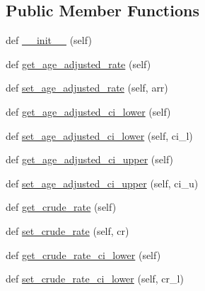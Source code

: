 \subsection*{Public Member Functions}
\begin{DoxyCompactItemize}
\item 
def \hyperlink{classbridges_1_1data__src__dependent_1_1cancer__incidence_1_1_cancer_incidence_a14ca87e4a6a0c2f394c46f0980ac922c}{\+\_\+\+\_\+init\+\_\+\+\_\+} (self)
\item 
def \hyperlink{classbridges_1_1data__src__dependent_1_1cancer__incidence_1_1_cancer_incidence_a8f679189f9811d6f5c43503f95d87666}{get\+\_\+age\+\_\+adjusted\+\_\+rate} (self)
\item 
def \hyperlink{classbridges_1_1data__src__dependent_1_1cancer__incidence_1_1_cancer_incidence_a437897ce848c5deec32b7c8eafc1ff68}{set\+\_\+age\+\_\+adjusted\+\_\+rate} (self, arr)
\item 
def \hyperlink{classbridges_1_1data__src__dependent_1_1cancer__incidence_1_1_cancer_incidence_ae567ee5ec0334912272652eaed74f838}{get\+\_\+age\+\_\+adjusted\+\_\+ci\+\_\+lower} (self)
\item 
def \hyperlink{classbridges_1_1data__src__dependent_1_1cancer__incidence_1_1_cancer_incidence_a846cee6b8db4c47c6f08aca463886351}{set\+\_\+age\+\_\+adjusted\+\_\+ci\+\_\+lower} (self, ci\+\_\+l)
\item 
def \hyperlink{classbridges_1_1data__src__dependent_1_1cancer__incidence_1_1_cancer_incidence_a0530a49e935e90b6ca0fe1c1d31f937b}{get\+\_\+age\+\_\+adjusted\+\_\+ci\+\_\+upper} (self)
\item 
def \hyperlink{classbridges_1_1data__src__dependent_1_1cancer__incidence_1_1_cancer_incidence_abed4a78c4e51559d19c1c5dfaadb2bc8}{set\+\_\+age\+\_\+adjusted\+\_\+ci\+\_\+upper} (self, ci\+\_\+u)
\item 
def \hyperlink{classbridges_1_1data__src__dependent_1_1cancer__incidence_1_1_cancer_incidence_a8ba4f50886eaeac0c7f40c3de1555ba5}{get\+\_\+crude\+\_\+rate} (self)
\item 
def \hyperlink{classbridges_1_1data__src__dependent_1_1cancer__incidence_1_1_cancer_incidence_ae7645f97543c24bb6ae70633f4c354e3}{set\+\_\+crude\+\_\+rate} (self, cr)
\item 
def \hyperlink{classbridges_1_1data__src__dependent_1_1cancer__incidence_1_1_cancer_incidence_a367573c2d980b8f8c9592afee5fb7c17}{get\+\_\+crude\+\_\+rate\+\_\+ci\+\_\+lower} (self)
\item 
def \hyperlink{classbridges_1_1data__src__dependent_1_1cancer__incidence_1_1_cancer_incidence_aff06e87c71cc36f0e2e7fb06afe189e6}{set\+\_\+crude\+\_\+rate\+\_\+ci\+\_\+lower} (self, cr\+\_\+l)

\end{DoxyCompactItemize}
